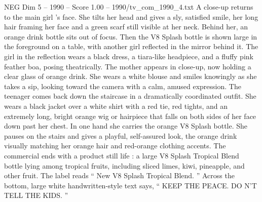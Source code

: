 \begin{textsample}{NEG Dim 5 – 1990 – Score 1.00 – 1990/tv\_com\_1990\_4.txt}
A close-up returns to the main girl ’s face.
She tilts her head and gives a sly, satisfied smile, her long hair framing her face and a green scarf still visible at her neck.
Behind her, an orange drink bottle sits out of focus.
Then the V8 Splash bottle is shown large in the foreground on a table, with another girl reflected in the mirror behind it.
The girl in the reflection wears a black dress, a tiara-like headpiece, and a fluffy pink feather boa, posing theatrically.
The mother appears in close-up, now holding a clear glass of orange drink.
She wears a white blouse and smiles knowingly as she takes a sip, looking toward the camera with a calm, amused expression.
The teenager comes back down the staircase in a dramatically coordinated outfit.
She wears a black jacket over a white shirt with a red tie, red tights, and an extremely long, bright orange wig or hairpiece that falls on both sides of her face down past her chest.
In one hand she carries the orange V8 Splash bottle.
She pauses on the stairs and gives a playful, self-assured look, the orange drink visually matching her orange hair and red-orange clothing accents.
The commercial ends with a product still life : a large V8 Splash Tropical Blend bottle lying among tropical fruits, including sliced limes, kiwi, pineapple, and other fruit.
The label reads “ New V8 Splash Tropical Blend. ” Across the bottom, large white handwritten-style text says, “ KEEP THE PEACE.
DO N’T TELL THE KIDS. ”

\end{textsample}
